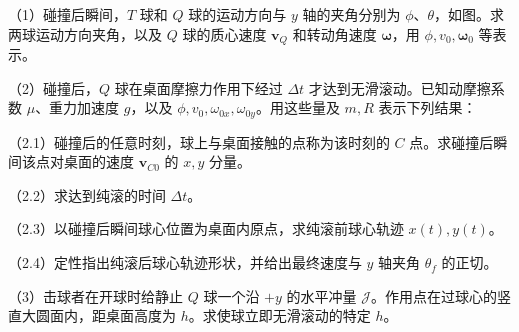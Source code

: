 \documentclass[12pt,a4paper,fontset=fandol]{ctexart}
\begin{document}
\begin{center}
\begin{minipage}{\linewidth}
\centering\begingroup
{}
\ifdim\wd\diagrambox>.88\linewidth
\sbox{\diagrambox}{\resizebox{.88\linewidth}{!}{\usebox{\diagrambox}}}
\fi
\ifdim\ht\diagrambox>.40\textheight
\resizebox{!}{.40\textheight}{\usebox{\diagrambox}}
\else\usebox{\diagrambox}\fi
\par{}
\endgroup\end{minipage}
\end{center}

（1）碰撞后瞬间，\(T\) 球和 \(Q\) 球的运动方向与 \(y\) 轴的夹角分别为
\(\phi\)、\(\theta\)，如图。求两球运动方向夹角，以及 \(Q\) 球的质心速度
\(\boldsymbol v_Q\) 和转动角速度 \(\boldsymbol\omega\)，用
\(\phi,v_0,\boldsymbol\omega_0\) 等表示。

（2）碰撞后，\(Q\) 球在桌面摩擦力作用下经过 \(\Delta t\)
才达到无滑滚动。已知动摩擦系数 \(\mu\)、重力加速度 \(g\)，以及
\(\phi,v_0,\omega_{0x},\omega_{0y}\)。用这些量及 \(m,R\) 表示下列结果：

（2.1）碰撞后的任意时刻，球上与桌面接触的点称为该时刻的 \(C\)
点。求碰撞后瞬间该点对桌面的速度 \(\boldsymbol v_{C0}\) 的 \(x,y\)
分量。

（2.2）求达到纯滚的时间 \(\Delta t\)。

（2.3）以碰撞后瞬间球心位置为桌面内原点，求纯滚前球心轨迹
\(x(t),y(t)\)。

（2.4）定性指出纯滚后球心轨迹形状，并给出最终速度与 \(y\) 轴夹角
\(\theta_f\) 的正切。

（3）击球者在开球时给静止 \(Q\) 球一个沿 \(+y\) 的水平冲量
\(\mathcal J\)。作用点在过球心的竖直大圆面内，距桌面高度为
\(h\)。求使球立即无滑滚动的特定 \(h\)。
\end{document}
